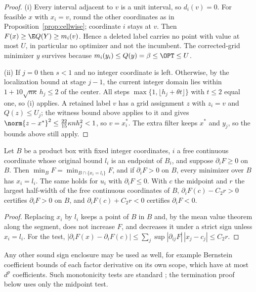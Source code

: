 \begin{proof}
(i) Every interval adjacent to $v$ is a unit interval, so $d_i(v)=0$. For
feasible $x$ with $x_i=v$, round the other coordinates as in
Proposition~\ref{prop:cellwise}; coordinate $i$ stays at $v$. Then
$F(x)\ge\E Q(Y)\ge m_i(v)$. Hence a deleted label carries no point with
value at most $U$, in particular no optimizer and not the incumbent. The
corrected-grid minimizer $y$ survives because $m_i(y_i)\le Q(y)=\beta\le\OPT\le U$.

(ii) If $j=0$ then $s<1$ and no integer coordinate is left. Otherwise, by
the localization bound at stage $j-1$, the current integer domain lies
within $1+10\sqrt{n\kappa}\,h_j\le2$ of the center. All steps
$\max\{1,\lfloor h_j+\theta t\rfloor\}$ with $t\le2$ equal one, so (i) applies.
A retained label $v$ has a grid assignment $z$ with $z_i=v$ and
$Q(z)\le U_j$; the witness bound above applies to it and
gives $\norm{z-x^*}^2\le\frac{22}{15}\kappa nh_j^2<1$, so $v=x^*_i$.
The extra filter keeps $x^*$ and $y_j$, so the bounds above still apply.
\end{proof}

\begin{lemma}\label{lem:monotone}
Let $B$ be a product box with fixed integer coordinates, $i$ a free
continuous coordinate whose original bound $l_i$ is an endpoint of $B_i$, and
suppose $\partial_iF\ge0$ on $B$. Then $\min_BF=\min_{B\cap\{x_i=l_i\}}F$, and
if $\partial_iF>0$ on $B$, every minimizer over $B$ has $x_i=l_i$. The same
holds for $u_i$ with $\partial_iF\le0$. With $c$ the midpoint and $r$ the
largest half-width of the free continuous coordinates of $B$,
$\partial_iF(c)-C_2r>0$ certifies $\partial_iF>0$ on $B$, and
$\partial_iF(c)+C_2r<0$ certifies $\partial_iF<0$.
\end{lemma}

\begin{proof}
Replacing $x_i$ by $l_i$ keeps a point of $B$ in $B$ and, by the mean value
theorem along the segment, does not increase $F$, and decreases it under a
strict sign unless $x_i=l_i$. For the test,
$|\partial_iF(x)-\partial_iF(c)|\le\sum_j\sup|\partial_{ij}F|\,|x_j-c_j|\le C_2r$.
\end{proof}

Any other sound sign enclosure may be used as well, for example Bernstein
coefficient bounds of each factor derivative on its own scope, which have at
most $d^p$ coefficients. Such monotonicity tests are standard
\cite{ArayaTrombettoniNeveu2010}; the termination proof below uses only the
midpoint test.


